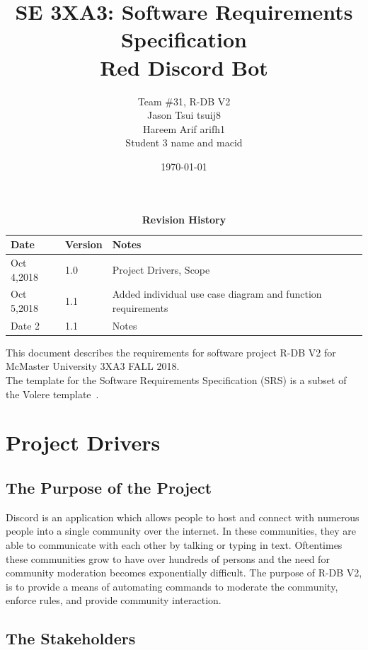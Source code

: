 \documentclass[12pt, titlepage]{article}
\title{SE 3XA3: Software Requirements Specification\\Red Discord Bot}
\author{Team \#31, R-DB V2
		\\ Jason Tsui tsuij8
		\\ Hareem Arif arifh1
		\\ Student 3 name and macid
}
\date{\today}
\begin{document}
\maketitle

\tableofcontents
\listoftables
\listoffigures

\begin{table}[bp]
\caption{\bf Revision History}
\begin{tabularx}{\textwidth}{p{3cm}p{2cm}X}
\toprule {\bf Date} & {\bf Version} & {\bf Notes}\\
\midrule
Oct 4,2018 & 1.0 & Project Drivers, Scope\\
Oct 5,2018 & 1.1 & Added individual use case diagram and function requirements\\
Date 2 & 1.1 & Notes\\
\bottomrule
\end{tabularx}
\end{table}

\newpage


This document describes the requirements for software project R-DB V2 for McMaster University 3XA3 FALL 2018.\\

The template for the Software
Requirements Specification (SRS) is a subset of the Volere
template~\citep{RobertsonAndRobertson2012}.



\section{Project Drivers}

\subsection{The Purpose of the Project}
Discord is an application which allows people to host and connect with numerous people into a single community over the internet. In these communities, they are able to communicate with each other by talking or typing in text. Oftentimes these communities grow to have over hundreds of persons and the need for community moderation becomes exponentially difficult. The purpose of R-DB V2, is to provide a means of automating commands to moderate the community, enforce rules, and provide community interaction. 

\subsection{The Stakeholders}
\end{document}
